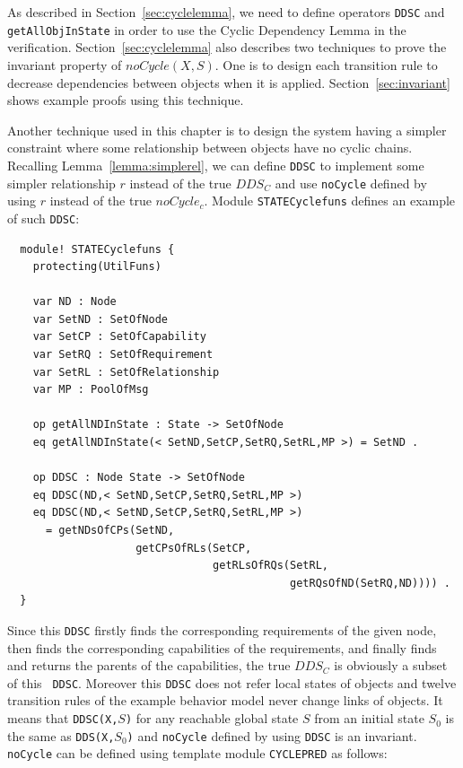 \documentclass[12pt]{report}
\newcommand{\stt}[1]{{\small{\tt {#1}}}}
\begin{document}
As described in Section~\ref{sec:cyclelemma}, we need to define
operators {\tt DDSC} and {\tt getAllObjInState} in order to use the
Cyclic Dependency Lemma in the
verification. Section~\ref{sec:cyclelemma} also describes two
techniques to prove the invariant property of $noCycle(X,S)$. One is
to design each transition rule to decrease dependencies between
objects when it is applied. Section~\ref{sec:invariant} shows example
proofs using this technique.

Another technique used in this chapter is to design the system having
a simpler constraint where some relationship between objects have no
cyclic chains. Recalling Lemma~\ref{lemma:simplerel}, we can define
{\tt DDSC} to implement some simpler relationship $r$ instead of the
true $\mathit{DDS_C}$ and use {\tt noCycle} defined by using $r$ instead of the true
$noCycle_c$. Module {\tt STATECyclefuns} defines an example of such
{\tt DDSC}:
\small
\begin{verbatim}
  module! STATECyclefuns {
    protecting(UtilFuns)
  
    var ND : Node
    var SetND : SetOfNode
    var SetCP : SetOfCapability
    var SetRQ : SetOfRequirement
    var SetRL : SetOfRelationship
    var MP : PoolOfMsg
  
    op getAllNDInState : State -> SetOfNode
    eq getAllNDInState(< SetND,SetCP,SetRQ,SetRL,MP >) = SetND .
  
    op DDSC : Node State -> SetOfNode
    eq DDSC(ND,< SetND,SetCP,SetRQ,SetRL,MP >)
    eq DDSC(ND,< SetND,SetCP,SetRQ,SetRL,MP >)
      = getNDsOfCPs(SetND,
                    getCPsOfRLs(SetCP,
                                getRLsOfRQs(SetRL,
                                            getRQsOfND(SetRQ,ND)))) .
  }
\end{verbatim}
\normalsize
Since this {\tt DDSC} firstly finds the corresponding requirements of
the given node, then finds the corresponding capabilities of the
requirements, and finally finds and returns the parents of the
capabilities, the true $\mathit{DDS_C}$ is obviously a subset of this {\tt
  DDSC}.  Moreover this {\tt DDSC} does not refer local states of
objects and twelve transition rules of the example behavior model
never change links of objects. It means that \stt{DDSC(X,$S$)} for any
reachable global state $S$ from an initial state $\mathit{S_0}$ is the same as
\stt{DDS(X,$\mathit{S_0}$)} and {\tt noCycle} defined by using {\tt DDSC} is an
invariant. {\tt noCycle} can be defined using template module {\tt CYCLEPRED}
as follows:
\end{document}
